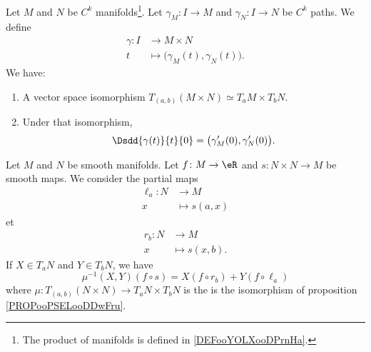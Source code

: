 \begin{lemma}       \label{LEMooTONEooFiysTA}
	Let \( M\) and \( N\) be \( C^k\) manifolds\footnote{The product of manifolds is defined in \ref{DEFooYOLXooDPrnHa}.}. Let \( \gamma_M\colon I\to M\) and \( \gamma_N\colon I\to N\) be \( C^k\) paths. We define
	\begin{equation}
		\begin{aligned}
			\gamma\colon I & \to M\times N                                \\
			t              & \mapsto \big( \gamma_M(t),\gamma_N(t) \big).
		\end{aligned}
	\end{equation}
	We have:
	\begin{enumerate}
		\item
		      A vector space isomorphism \( T_{(a,b)}(M\times N)\simeq T_aM\times T_bN\).
		\item
		      Under that isomorphism,
		      \begin{equation}
			      \Dsdd{ \gamma(t) }{t}{0}=\big( \gamma_M'(0),\gamma_N'(0) \big).
		      \end{equation}
	\end{enumerate}
\end{lemma}

\begin{proposition}	\label{PROPooJIFTooGboJoI}
	Let \( M\) and \( N\) be smooth manifolds. Let \(f \colon M\to \eR  \) and \(s \colon N\times N\to M  \) be smooth maps. We consider the partial maps
	\begin{equation}
		\begin{aligned}
			\ell_a\colon N & \to M          \\
			x              & \mapsto s(a,x)
		\end{aligned}
	\end{equation}
	et
	\begin{equation}
		\begin{aligned}
			r_b\colon N & \to M           \\
			x           & \mapsto s(x,b).
		\end{aligned}
	\end{equation}
	If \( X\in T_aN\) and \( Y\in T_bN\), we have
	\begin{equation}
		\mu^{-1}(X,Y)(f\circ s)=X(f\circ r_b)+Y(f\circ \ell_a)
	\end{equation}
	where \(\mu \colon T_{(a,b)}(N\times N)\to T_aN\times T_bN  \) is the is the isomorphism of proposition \eqref{PROPooPSELooDDwFru}.
\end{proposition}

